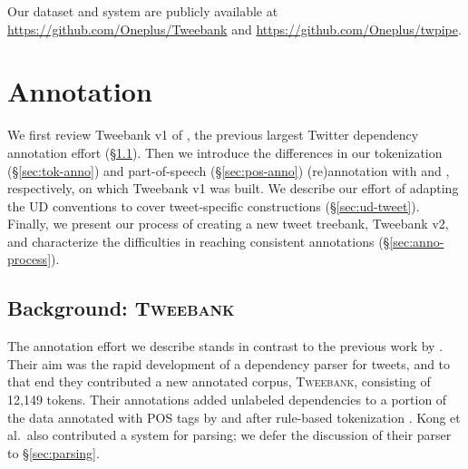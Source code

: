\documentclass[11pt,a4paper]{article}
\begin{document}
Our dataset and system are publicly available at \url{https://github.com/Oneplus/Tweebank}
and \url{https://github.com/Oneplus/twpipe}.


\section{Annotation}\label{sec:anno}


We first review {\sc Tweebank v1} of \citet{kong-EtAl:2014:EMNLP2014},
the previous largest Twitter dependency annotation effort 
(\S\ref{sec:tweebank}).
Then we introduce the differences in our tokenization
(\S\ref{sec:tok-anno}) and part-of-speech (\S\ref{sec:pos-anno}) (re)annotation with \citet{ICWSM101540} and 
\citet{gimpel-EtAl:2011:ACL-HLT2011}, respectively, on which {\sc Tweebank v1} was built. 
We describe our effort of adapting the
UD conventions to cover tweet-specific constructions (\S\ref{sec:ud-tweet}). 
Finally, we present our process of creating a new tweet treebank, 
{\sc Tweebank v2}, and characterize
the difficulties in reaching consistent annotations (\S\ref{sec:anno-process}).

\subsection{Background: \textsc{Tweebank}}\label{sec:tweebank}

The annotation effort we describe stands in contrast to the previous work
by .  Their aim was the rapid
development of a dependency parser for tweets, and to that end they
contributed a new annotated corpus, \textsc{Tweebank}, consisting of
12,149 tokens.  Their annotations added unlabeled dependencies to a portion of the data
annotated with POS tags by 
 and
 after rule-based tokenization \citep{ICWSM101540}.
Kong et al.~also contributed a system for parsing;
we defer the discussion of their parser to \S\ref{sec:parsing}.
\end{document}
